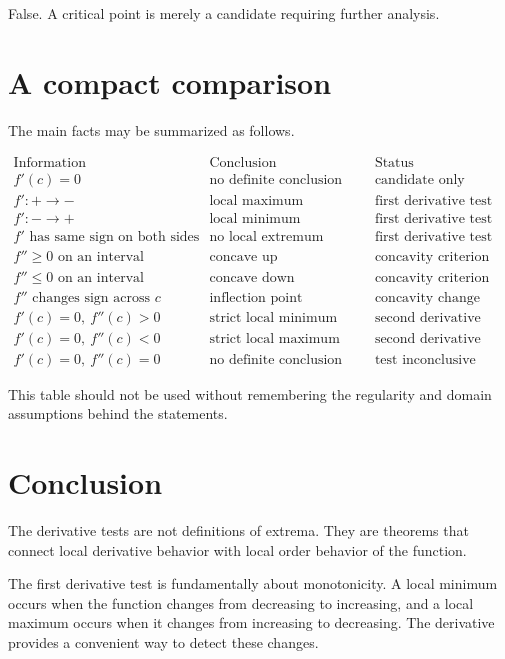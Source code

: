 \documentclass{essay}
\begin{document}
False. A critical point is merely a candidate requiring further analysis.

\section{A compact comparison}

The main facts may be summarized as follows.

\[
\begin{array}{c|c|c}
\text{Information} & \text{Conclusion} & \text{Status}\\
\hline
f'(c)=0
& \text{no definite conclusion}
& \text{candidate only}\\[4pt]
f':+\to-
& \text{local maximum}
& \text{first derivative test}\\[4pt]
f':-\to+
& \text{local minimum}
& \text{first derivative test}\\[4pt]
f' \text{ has same sign on both sides}
& \text{no local extremum}
& \text{first derivative test}\\[4pt]
f''\geq0 \text{ on an interval}
& \text{concave up}
& \text{concavity criterion}\\[4pt]
f''\leq0 \text{ on an interval}
& \text{concave down}
& \text{concavity criterion}\\[4pt]
f'' \text{ changes sign across } c
& \text{inflection point candidate}
& \text{concavity change}\\[4pt]
f'(c)=0,\ f''(c)>0
& \text{strict local minimum}
& \text{second derivative test}\\[4pt]
f'(c)=0,\ f''(c)<0
& \text{strict local maximum}
& \text{second derivative test}\\[4pt]
f'(c)=0,\ f''(c)=0
& \text{no definite conclusion}
& \text{test inconclusive}
\end{array}
\]

This table should not be used without remembering the regularity and domain assumptions behind the statements.

\section{Conclusion}

The derivative tests are not definitions of extrema. They are theorems that connect local derivative behavior with local order behavior of the function.

The first derivative test is fundamentally about monotonicity. A local minimum occurs when the function changes from decreasing to increasing, and a local maximum occurs when it changes from increasing to decreasing. The derivative provides a convenient way to detect these changes.
\end{document}
